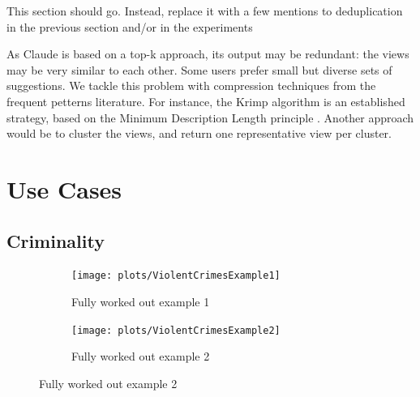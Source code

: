 { \color{red} This section should go. Instead, replace it with a few mentions
to deduplication in the previous section and/or in the experiments}

As Claude is based on a top-k approach, its output may be redundant: the views
may be very similar to each other.  Some users prefer small but diverse sets of
suggestions.  We tackle this problem with compression techniques from the
frequent petterns literature. For instance, the Krimp algorithm is an
established strategy, based on the Minimum Description Length principle
\cite{vreeken2011krimp}. Another approach would be to cluster the views, and
return one representative view per cluster.


\section{Use Cases}

\subsection{Criminality}

\begin{figure}[t!]
    \centering
    
    \begin{subfigure}[b]{0.75\textwidth}
    \texttt{[image: plots/ViolentCrimesExample1]}
    \caption{Fully worked out example 1}
    \label{fig:violent-example1}
    \end{subfigure}

    \begin{subfigure}[b]{0.75\textwidth}
    \texttt{[image: plots/ViolentCrimesExample2]}
    \caption{Fully worked out example 2}
    \label{fig:violent-example2}
    \end{subfigure}

\label{pic:violent-example}
\end{figure}

